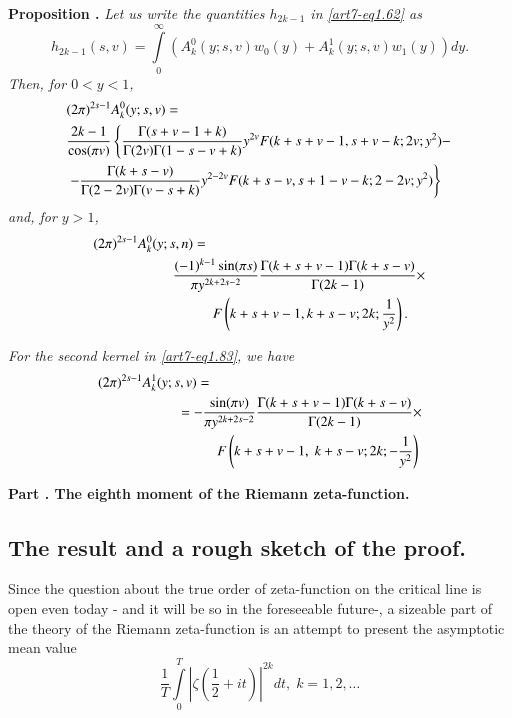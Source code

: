 \medskip
\noindent
{\bfseries Proposition .\label{art7-prop5}} 
\textit{Let us write the quantities $h_{2k-1}$ in \eqref{art7-eq1.62} as}
\begin{equation}
h_{2k-1} (s,v) = \int\limits^\infty_0 (A^0_k (y;s, v) w_0 (y) + A^1_k (y;s,v) w_1 (y)) dy. \label{art7-eq1.83}
\end{equation}\pageoriginale
\textit{Then, for $0<y<1$,}
\begin{align}
&(2\pi)^{2s-1} A^0_k (y; s, v) =\label{art7-eq1.84}\\
&\frac{2k-1}{\cos (\pi v)} \left\{\frac{\Gamma (s+ v-1+k)}{\Gamma (2v) \Gamma (1-s-v+k)} y^{2v} F (k+s+v -1, s+v-k; 2 v ; y^2) - \right.\notag \\
& \left. -\frac{\Gamma (k+s-v)}{\Gamma (2-2v)\Gamma (v-s+k)} y^{2-2v} F(k+s-v, s+1-v-k; 2-2v; y^2) \right\} \notag
\end{align}
\textit{and, for $y>1$,}
\begin{align}
& (2\pi)^{2s-1} A^0_k (y;s,n) = \hspace{2cm} \label{art7-eq1.85} \\
& \hspace{2cm} \frac{(-1)^{k-1} \sin (\pi s) }{\pi y^{2k+2s-2}} \frac{\Gamma (k+s+v-1) \Gamma(k+s-v)}{\Gamma (2k-1)} \times \notag\\
& \hspace{3cm} F \left(k+s + v -1 , k + s-v; 2k; \frac{1}{y^2} \right). \notag
\end{align}

\textit{For the second kernel in \eqref{art7-eq1.83}, we have}
\begin{align}
&(2\pi)^{2s-1} A^1_k (y; s, v) = \hspace{2cm}\\
&\hspace{2cm} = - \frac{\sin (\pi v)}{\pi y^{2k+ 2s -2}} \frac{\Gamma (k+ s+v -1) \Gamma (k+s-v)}{ \Gamma (2k-1)} \times  \notag\\
&\hspace{3cm} F\left(k + s + v -1, \; k + s- v; 2k; - \frac{1}{y^2} \right) \notag
\end{align}

\bigskip
\begin{center}
{\Large \textbf{Part .\label{art7-partII} The eighth moment of the Riemann zeta-function.}}
\end{center}

\setcounter{section}{2}
\setcounter{subsection}{0}
\subsection{The result and a rough sketch of the proof.}\label{art7-subsec2.1}
Since the question about the true order of zeta-function on the critical line is open even today - and it will be so in the foreseeable future-, a sizeable part of the theory of the Riemann zeta-function is an attempt to present the asymptotic mean value
\setcounter{equation}{0}
\begin{equation}
\frac{1}{T} \int\limits^T_0 |\zeta (\frac{1}{2} + it)|^{2k} dt, \; k = 1, 2, \ldots \label{art7-eq2.1}
\end{equation}

